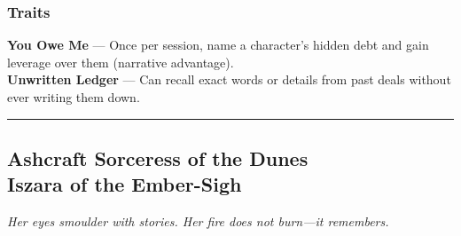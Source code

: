 \begin{paracol}{3}
    \subsubsection{Traits}
        \textbf{You Owe Me} — Once per session, name a character’s hidden debt and gain leverage over them (narrative advantage).\\
        \textbf{Unwritten Ledger} — Can recall exact words or details from past deals without ever writing them down.
\end{paracol}

\vspace{.5\baselineskip}
\hrule
\vspace{.5\baselineskip}

\subsection{{\small Ashcraft Sorceress of the Dunes}\\ Iszara of the Ember-Sigh}
\label{npc:iszara-ember-sigh}

\emph{Her eyes smoulder with stories. Her fire does not burn—it remembers.}
\vspace{.5\baselineskip}

